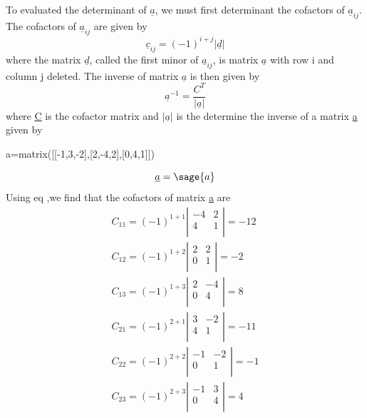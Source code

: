 \documentclass[12pt]{report}
\begin{document}
To evaluated the determinant of $\underline{a}$, we must first determinant the
cofactors of $\underline{a}_{ij}$.
The cofactors of $\underline{a}_{ij}$ are given by
\begin{equation}\underline{c}_{ij}=(-1)^{i+j} |\underline{d}|\end{equation}
where the matrix $\underline{d}$, called the first minor of $\underline{a}_{ij}$, is
matrix $\underline{a}$ with row i and column j deleted. The inverse of matrix
$\underline{a}$ is then given by
\begin{equation}\underline{a}^{-1}=\frac{C^{T}}{|\underline{a}|}\label{eq:cofinverse}\end{equation}
where \underline{C} is the cofactor matrix and $|\underline{a}|$ is the determine the inverse of a matrix \underline{a} given by 
\begin{sagesilent}
a=matrix([[-1,3,-2],[2,-4,2],[0,4,1]])
\end{sagesilent}
\begin{equation}\underline{a} = \sage{a} \end{equation}
Using eq ,we find that the cofactors of matrix \underline{a} are 
\begin{eqnarray}
  C_{11} = (-1)^{1+1} \left|\begin{array}{rr} -4 &  2 \\4 & 1\\ \end{array}\right| = -12 \nonumber 
\\C_{12} = (-1)^{1+2} \left|\begin{array}{rr}  2 &  2 \\0 & 1\\ \end{array}\right| =  -2 \nonumber 
\\C_{13} = (-1)^{1+3} \left|\begin{array}{rr}  2 & -4 \\0 & 4\\ \end{array}\right| =   8 \nonumber 
\\C_{21} = (-1)^{2+1} \left|\begin{array}{rr}  3 & -2 \\4 & 1\\ \end{array}\right| = -11 \nonumber 
\\C_{22} = (-1)^{2+2} \left|\begin{array}{rr} -1 & -2 \\0 & 1\\ \end{array}\right| =  -1 \nonumber 
\\C_{23} = (-1)^{2+3} \left|\begin{array}{rr} -1 &  3 \\0 & 4\\ \end{array}\right| =   4 \label{eq:cofa}\end{eqnarray}  
\end{document}
